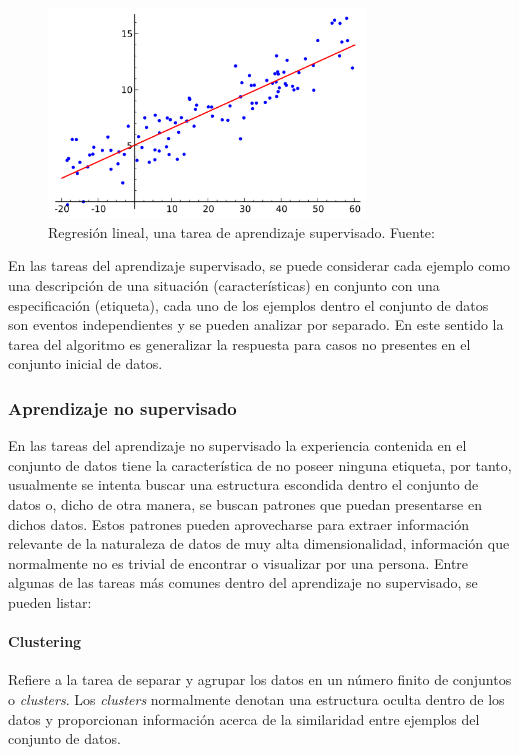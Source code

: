             \begin{figure}[!h] 
                \centering
                \includegraphics[width=0.75\textwidth]{img/regression}
                \caption[Regresión lineal]{Regresión lineal, una tarea de aprendizaje supervisado. Fuente: \cite{wikipedia_2018} }
                \label{fig:regresion}
            \end{figure}

        En las tareas del aprendizaje supervisado, se puede considerar cada ejemplo como una descripción de 
        una situación (características) en conjunto con una especificación (etiqueta), cada uno de los ejemplos 
        dentro el conjunto de datos son eventos independientes y se pueden analizar por separado. En este sentido
        la tarea del algoritmo es generalizar la respuesta para casos no presentes en el conjunto inicial de datos.

        \subsubsection{Aprendizaje no supervisado}
        En las tareas del aprendizaje no supervisado la experiencia contenida en el conjunto de datos tiene la característica de 
        no poseer ninguna etiqueta, por tanto, usualmente se intenta buscar una estructura escondida dentro el conjunto de datos 
        o, dicho de otra manera, se buscan patrones que puedan presentarse en dichos datos. Estos patrones pueden aprovecharse 
        para extraer información relevante de la naturaleza de datos de muy alta dimensionalidad, información que normalmente no 
        es trivial de encontrar o visualizar por una persona. Entre algunas de las tareas más comunes dentro del aprendizaje no 
        supervisado, se pueden listar:

            \paragraph{Clustering}
            Refiere a la tarea de separar y agrupar los datos en un número finito de conjuntos o \textit{clusters}. Los 
            \textit{clusters} normalmente denotan una estructura oculta dentro de los datos y proporcionan información acerca 
            de la similaridad entre ejemplos del conjunto de datos.

